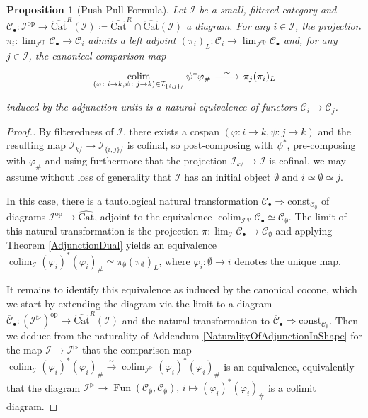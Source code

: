 \documentclass[a4paper,reqno,10pt]{amsart}
\newtheorem{proposition}[theorem]{Proposition}
\theoremstyle{definition}
\theoremstyle{remark}
\newcommand{\br}[1]{\left(#1\right)}
\newcommand{\iso}{\stackrel{\sim}{\rightarrow}}
\newcommand{\C}{\mathcal{C}}
\newcommand{\I}{\mathcal{I}}
\newcommand{\const}{\mathrm{const}}
\DeclareMathOperator*{\colim}{colim}
\newcommand{\Fun}{\operatorname{Fun}}
\newcommand{\Cat}{\mathrm{Cat}}
\newcommand{\op}{\mathrm{op}}
\begin{document}
\begin{proposition}[Push-Pull Formula]\label{PushPullFormula}
Let $\I$ be a small, filtered category and $\C_{\bullet}\colon\I^{\op}\rightarrow\widehat{\Cat}^R(\I)\coloneqq\widehat{\Cat}^R\cap\widehat{\Cat}\br{\I}$ a diagram. For any $i\in\I$, the projection $\pi_i\colon\lim_{\I^{\op}}\C_{\bullet}\rightarrow\C_i$ admits a left adjoint $(\pi_i)_L\colon\C_i\rightarrow\lim_{\I^{\op}}\C_{\bullet}$ and, for any $j\in\I$, the canonical comparison map
\begin{equation*}
\begin{tikzcd}
\colim\limits_{(\varphi\colon i\rightarrow k,\psi\colon j\rightarrow k)\in\I_{\{i,j\}/}}\psi^{\ast}\varphi_{\#}\arrow[r,"\sim"] & \pi_j(\pi_i)_L
\end{tikzcd}
\end{equation*}
induced by the adjunction units is a natural equivalence of functors $\C_i\rightarrow\C_j$.
\end{proposition}
\begin{proof}[Proof.]
By filteredness of $\I$, there exists a cospan $(\varphi\colon i\rightarrow k,\psi\colon j\rightarrow k)$ and the resulting map $\I_{k/}\rightarrow\I_{\{i,j\}/}$ is cofinal, so post-composing with $\psi^{\ast}$, pre-composing with $\varphi_{\#}$ and using furthermore that the projection $\I_{k/}\rightarrow\I$ is cofinal, we may assume without loss of generality that $\I$ has an initial object $\emptyset$ and $i\simeq\emptyset\simeq j$.

In this case, there is a tautological natural transformation $\C_{\bullet}\Rightarrow\const_{\C_{\emptyset}}$ of diagrams $\I^{\op}\rightarrow\widehat{\Cat}$, adjoint to the equivalence $\colim_{\I^{\op}}\C_{\bullet}\simeq\C_{\emptyset}$. The limit of this natural transformation is the projection $\pi\colon\lim_{\I}\C_{\bullet}\rightarrow\C_{\emptyset}$ and applying Theorem \ref{AdjunctionDual} yields an equivalence $\colim_{\I}(\varphi_i)^{\ast}(\varphi_i)_{\#}\simeq\pi_{\emptyset}(\pi_{\emptyset})_L$, where $\varphi_i\colon\emptyset\rightarrow i$ denotes the unique map.

It remains to identify this equivalence as induced by the canonical cocone, which we start by extending the diagram via the limit to a diagram $\overline{\C}_{\bullet}\colon(\I^{\triangleright})^{\op}\rightarrow\widehat{\Cat}^R(\I)$ and the natural transformation to $\overline{\C}_{\bullet}\Rightarrow\const_{\C_{\emptyset}}$. Then we deduce from the naturality of Addendum \ref{NaturalityOfAdjunctionInShape} for the map $\I\rightarrow\I^{\triangleright}$ that the comparison map $\colim_{\I}(\varphi_i)^{\ast}(\varphi_i)_{\#}\iso\colim_{\I^{\triangleright}}(\varphi_i)^{\ast}(\varphi_i)_{\#}$ is an equivalence, equivalently that the diagram $\I^{\triangleright}\rightarrow\Fun(\C_{\emptyset},\C_{\emptyset}),\,i\mapsto(\varphi_i)^{\ast}(\varphi_i)_{\#}$ is a colimit diagram.
\end{proof}
\end{document}
